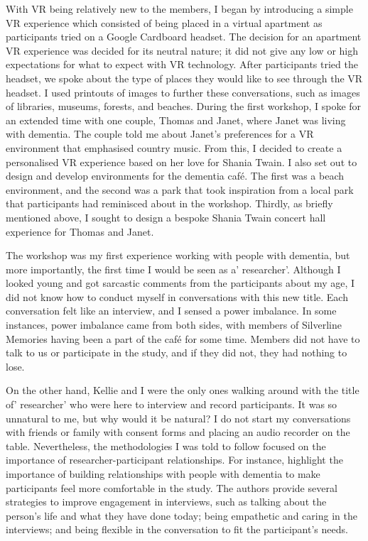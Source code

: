 With VR being relatively new to the members, I began by introducing a simple VR experience which consisted of being placed in a virtual apartment as participants tried on a Google Cardboard headset. The decision for an apartment VR experience was decided for its neutral nature; it did not give any low or high expectations for what to expect with VR technology. After participants tried the headset, we spoke about the type of places they would like to see through the VR headset. I used printouts of images to further these conversations, such as images of libraries, museums, forests, and beaches. During the first workshop, I spoke for an extended time with one couple, Thomas and Janet, where Janet was living with dementia. The couple told me about Janet's preferences for a VR environment that emphasised country music. From this, I decided to create a personalised VR experience based on her love for Shania Twain. I also set out to design and develop environments for the dementia café. The first was a beach environment, and the second was a park that took inspiration from a local park that participants had reminisced about in the workshop. Thirdly, as briefly mentioned above, I sought to design a bespoke Shania Twain concert hall experience for Thomas and Janet.

The workshop was my first experience working with people with dementia, but more importantly, the first time I would be seen as a' researcher'. Although I looked young and got sarcastic comments from the participants about my age, I did not know how to conduct myself in conversations with this new title. Each conversation felt like an interview, and I sensed a power imbalance. In some instances, power imbalance came from both sides, with members of Silverline Memories having been a part of the café for some time. Members did not have to talk to us or participate in the study, and if they did not, they had nothing to lose.

On the other hand, Kellie and I were the only ones walking around with the title of' researcher' who were here to interview and record participants. It was so unnatural to me, but why would it be natural? I do not start my conversations with friends or family with consent forms and placing an audio recorder on the table. Nevertheless, the methodologies I was told to follow focused on the importance of researcher-participant relationships. For instance, \cite{mckillop2004make} highlight the importance of building relationships with people with dementia to make participants feel more comfortable in the study. The authors provide several strategies to improve engagement in interviews, such as talking about the person's life and what they have done today; being empathetic and caring in the interviews; and being flexible in the conversation to fit the participant's needs.


